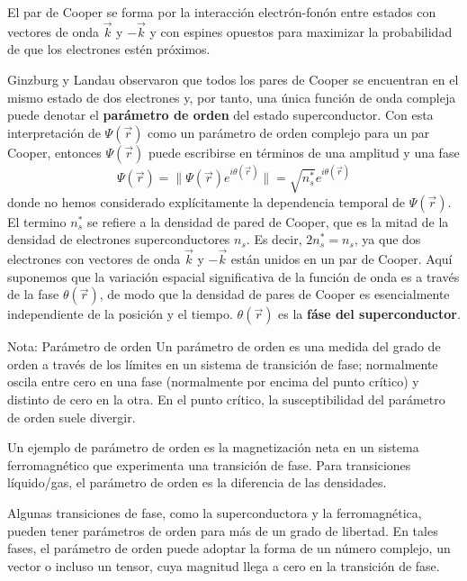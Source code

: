 El par de Cooper se forma por la interacción electrón-fonón entre estados con vectores de onda $\vec{k}$ y $-\vec{k}$ y con espines opuestos para maximizar la probabilidad de que los electrones estén próximos. 

Ginzburg y Landau observaron que todos los pares de Cooper se encuentran en el mismo estado de dos electrones y, por tanto, una única función de onda compleja puede denotar el \textbf{parámetro de orden} del estado superconductor. Con esta interpretación de $\Psi(\vec{r})$ como un parámetro de orden complejo para un par Cooper, entonces $\Psi(\vec{r})$ puede escribirse en términos de una amplitud y una fase
\begin{equation}
\Psi(\vec{r}) = \| \Psi(\vec{r}) e^{i \theta (\vec{r})} \| = \sqrt{n_s^*} e^{i \theta (\vec{r})}
\end{equation}
donde no hemos considerado explícitamente la dependencia temporal de $\Psi(\vec{r})$. El termino $n_s^*$ se refiere a la densidad de pared de Cooper, que es la mitad de la densidad de electrones superconductores $n_s$. Es decir, $2n_s^* = n_s$, ya que dos electrones con vectores de onda $\vec{k}$ y $-\vec{k}$ están unidos en un par de Cooper. Aquí suponemos que la variación espacial significativa de la función de onda es a través de la fase $\theta (\vec{r})$, de modo que la densidad de pares de Cooper es esencialmente independiente de la posición y el tiempo. $\theta (\vec{r})$ es la \textbf{fáse del superconductor}.

\begin{mybox_blue}{Nota: Parámetro de orden}
    Un parámetro de orden es una medida del grado de orden a través de los límites en un sistema de transición de fase; normalmente oscila entre cero en una fase (normalmente por encima del punto crítico) y distinto de cero en la otra. En el punto crítico, la susceptibilidad del parámetro de orden suele divergir.
    \vspace{0.3cm}
    
    Un ejemplo de parámetro de orden es la magnetización neta en un sistema ferromagnético que experimenta una transición de fase. Para transiciones líquido/gas, el parámetro de orden es la diferencia de las densidades. 
    \vspace{0.3cm}
    
    Algunas transiciones de fase, como la superconductora y la ferromagnética, pueden tener parámetros de orden para más de un grado de libertad. En tales fases, el parámetro de orden puede adoptar la forma de un número complejo, un vector o incluso un tensor, cuya magnitud llega a cero en la transición de fase.
\end{mybox_blue}

